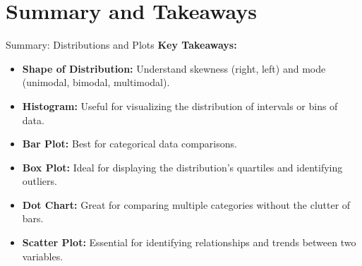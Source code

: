 \documentclass[handout]{beamer} %
\begin{document}
\section{Summary and Takeaways}

\begin{frame}{Summary: Distributions and Plots}
    \textbf{Key Takeaways:}
    \begin{itemize}
        \item \textbf{Shape of Distribution:} Understand skewness (right, left) and mode (unimodal, bimodal, multimodal).
        \item \textbf{Histogram:} Useful for visualizing the distribution of intervals or bins of data.
        \item \textbf{Bar Plot:} Best for categorical data comparisons.
        \item \textbf{Box Plot:} Ideal for displaying the distribution's quartiles and identifying outliers.
        \item \textbf{Dot Chart:} Great for comparing multiple categories without the clutter of bars.
        \item \textbf{Scatter Plot:} Essential for identifying relationships and trends between two variables.
    \end{itemize}
\end{frame}
\end{document}
